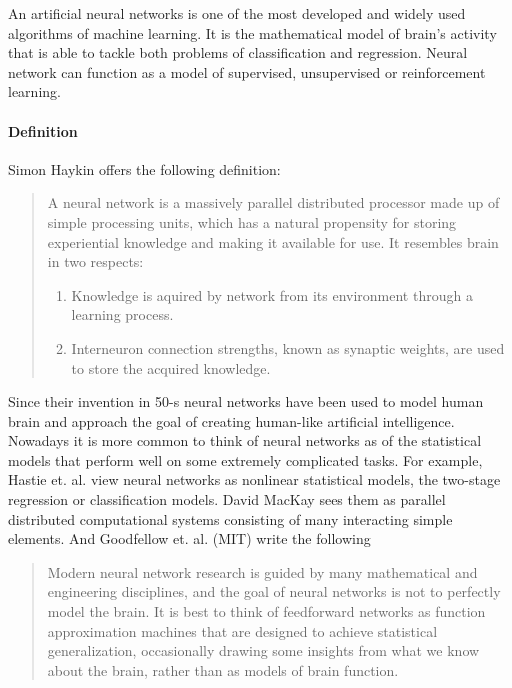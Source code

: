 An artificial neural networks is one of the most developed and widely used algorithms of machine learning.
It is the mathematical model of brain's activity that is able to tackle both problems of classification and regression. Neural network can function as a model of supervised, unsupervised or reinforcement learning. 
  
\paragraph{Definition}
Simon Haykin \cite{Haykin-2005} offers the following definition:
\begin{quote}
  A neural network is a massively parallel distributed processor made up of simple processing units, which has a natural propensity for storing experiential knowledge and making it available for use. It resembles brain in two respects:
  \begin{enumerate}
    \item Knowledge is aquired by network from its environment through a learning process.
    \item Interneuron connection strengths, known as synaptic weights, are used to store the acquired knowledge.
  \end{enumerate}
\end{quote}

Since their invention in 50-s neural networks have been used to model human brain and approach the goal of creating human-like artificial intelligence. Nowadays it is more common to think of neural networks as of the statistical models that perform well on some extremely complicated tasks. For example, Hastie et. al. \cite{Hastie-et-al-2013} view neural networks as nonlinear statistical models, the two-stage regression or classification models. David MacKay \cite{MacKay-2003} sees them as parallel distributed computational systems consisting of many interacting simple elements. And Goodfellow et. al. (MIT) \cite{Goodfellow-et-al-2016} write the following

\begin{quote}
  Modern neural network research is guided by many mathematical and engineering disciplines, and the goal of neural networks is not to perfectly model the brain. It is best to think of feedforward networks as function approximation machines that are designed to achieve statistical generalization, occasionally drawing some insights from what we know about the brain, rather than as models of brain function.
\end{quote}
